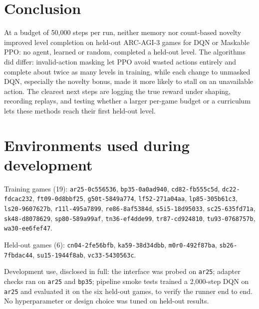 \documentclass[10pt]{article}
\begin{document}
\section{Conclusion}
\label{sec:conclusion}

At a budget of 50,000 steps per run, neither memory nor count-based novelty improved level completion on held-out ARC-AGI-3 games for DQN or Maskable PPO: no agent, learned or random, completed a held-out level. The algorithms did differ: invalid-action masking let PPO avoid wasted actions entirely and complete about twice as many levels in training, while each change to unmasked DQN, especially the novelty bonus, made it more likely to stall on an unavailable action. The clearest next steps are logging the true reward under shaping, recording replays, and testing whether a larger per-game budget or a curriculum lets these methods reach their first held-out level.





\beginSupplementaryMaterials

\section{Environments used during development}
\label{sec:supp-games}

Training games (19): \texttt{ar25-0c556536}, \texttt{bp35-0a0ad940}, \texttt{cd82-fb555c5d}, \texttt{dc22-fdcac232}, \texttt{ft09-0d8bbf25}, \texttt{g50t-5849a774}, \texttt{lf52-271a04aa}, \texttt{lp85-305b61c3}, \texttt{ls20-9607627b}, \texttt{r11l-495a7899}, \texttt{re86-8af5384d}, \texttt{s5i5-18d95033}, \texttt{sc25-635fd71a}, \texttt{sk48-d8078629}, \texttt{sp80-589a99af}, \texttt{tn36-ef4dde99}, \texttt{tr87-cd924810}, \texttt{tu93-0768757b}, \texttt{wa30-ee6fef47}.

Held-out games (6): \texttt{cn04-2fe56bfb}, \texttt{ka59-38d34dbb}, \texttt{m0r0-492f87ba}, \texttt{sb26-7fbdac44}, \texttt{su15-1944f8ab}, \texttt{vc33-5430563c}.

Development use, disclosed in full: the interface was probed on \texttt{ar25}; adapter checks ran on \texttt{ar25} and \texttt{bp35}; pipeline smoke tests trained a 2,000-step DQN on \texttt{ar25} and evaluated it on the six held-out games, to verify the runner end to end. No hyperparameter or design choice was tuned on held-out results.
\end{document}

